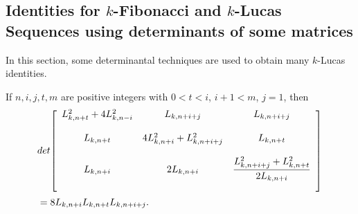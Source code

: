 \subsection{Identities for $k$-Fibonacci and $k$-Lucas Sequences using determinants of some matrices}
In this section, some determinantal techniques are used to obtain many $k$-Lucas identities.
\begin{theorem}
If  $n, i, j, t, m$ are positive integers with $0 < t < i$, $i+1 < m$, $j = 1$, then 
\begin{align*}
&det {\left[
          \begin{array}{ccc}
           \bigskip
            L_{k, n+t}^2+4 L_{k, n-i}^2 & L_{k, n+i+j} & L_{k, n+i+j} \\
             \bigskip
            L_{k, n+t}& 4 L_{k, n+i}^2+L_{k, n+i+j}^2 & L_{k, n+t} \\
     \bigskip
            L_{k, n+i}& 2 L_{k, n+i} & \dfrac{L_{k, n+i+j}^2 + L_{k, n+t}^2}{2L_{k, n+i}} \\       
          \end{array}
        \right]}\\& = 8 L_{k, n+i} L_{k, n+t} L_{k, n+i+j}.
\end{align*}
\end{theorem}
